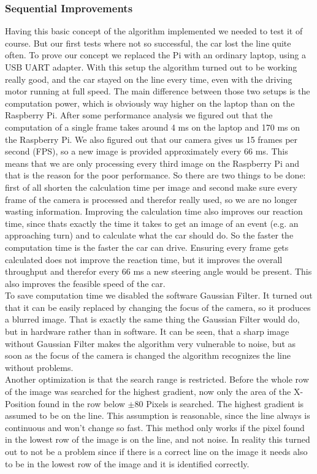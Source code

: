 \documentclass[11pt,twocolumn]{article}
\begin{document}
\subsubsection{Sequential Improvements}
Having this basic concept of the algorithm implemented we needed to test it of course. But our first tests where not so successful, the car lost the line quite often. To prove our concept we replaced the Pi with an ordinary laptop, using a USB UART adapter. With this setup the algorithm turned out to be working really good, and the car stayed on the line every time, even with the driving motor running at full speed. The main difference between those two setups is the computation power, which is obviously way higher on the laptop than on the Raspberry Pi. After some performance analysis we figured out that the computation of a single frame takes around 4 ms on the laptop and 170 ms on the Raspberry Pi.
We also figured out that our camera gives us 15 frames per second (FPS), so a new image is provided approximately every 66 ms. This means that we are only processing every third image on the Raspberry Pi and that is the reason for the poor performance. So there are two things to be done: first of all shorten the calculation time per image and second make sure every frame of the camera is processed and therefor really used, so we are no longer wasting information. Improving the calculation time also improves our reaction time, since thats exactly the time it takes to get an image of an event (e.g. an approaching turn) and to calculate what the car should do. So the faster the computation time is the faster the car can drive. Ensuring every frame gets calculated does not improve the reaction time, but it improves the overall throughput and therefor every 66 ms a new steering angle would be present. This also improves the feasible speed of the car.\\
To save computation time we disabled the software Gaussian Filter. It turned out that it can be easily replaced by changing the focus of the camera, so it produces a blurred image. That is exactly the same thing the Gaussian Filter would do, but in hardware rather than in software. It can be seen, that a sharp image without Gaussian Filter makes the algorithm very vulnerable to noise, but as soon as the focus of the camera is changed the algorithm recognizes the line without problems. \\
Another optimization is that the search range is restricted. Before the whole row of the image was searched for the highest gradient, now only the area of the X-Position found in the row below $\pm80$ Pixels is searched. The highest gradient is assumed to be on the line. This assumption is reasonable, since the line always is continuous and won't change so fast. This method only works if the pixel found in the lowest row of the image is on the line, and not noise. In reality this turned out to not be a problem since if there is a correct line on the image it needs also to be in the lowest row of the image and it is identified correctly.\\
\end{document}
